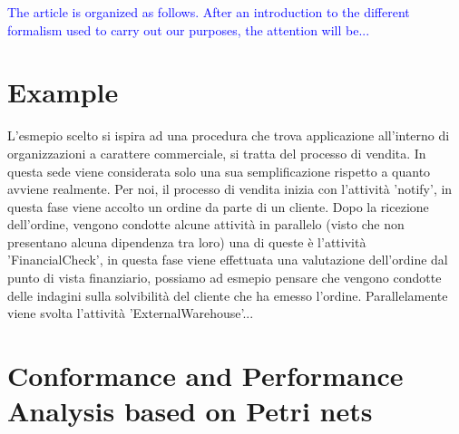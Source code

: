 \documentclass[11pt]{article}
\begin{document}
\textcolor{blue}{
The article is organized as follows. After an introduction to the different formalism used to carry out our purposes, the attention will be...
}

\section{Example}\label{example}
L'esmepio scelto si ispira ad una procedura che trova applicazione all'interno di organizzazioni a carattere commerciale, si tratta del processo di vendita. In questa sede viene considerata solo una sua semplificazione rispetto a quanto avviene realmente. Per noi, il processo di vendita inizia con l'attività 'notify', in questa fase viene accolto un ordine da parte di un cliente. Dopo la ricezione dell'ordine, vengono condotte alcune attività in parallelo (visto che non presentano alcuna dipendenza tra loro) una di queste è l'attività 'FinancialCheck', in questa fase viene effettuata una valutazione dell'ordine dal punto di vista finanziario, possiamo ad esmepio pensare che vengono condotte delle indagini sulla solvibilità del cliente che ha emesso l'ordine. Parallelamente viene svolta l'attività 'ExternalWarehouse'...

\section{Conformance and Performance Analysis based on Petri nets}
\end{document}
